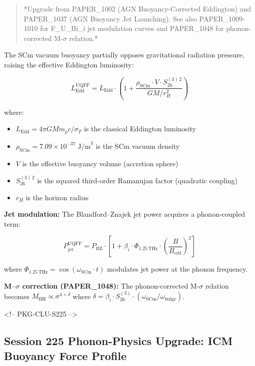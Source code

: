 \documentclass[12pt,a4paper]{article}
\begin{document}
\begin{quote}
*Upgrade from PAPER\_1002 (AGN Buoyancy-Corrected Eddington) and PAPER\_1037
(AGN Buoyancy Jet Launching).  See also PAPER\_1009-1010 for F\_{U\_Bi\_i} jet
modulation curves and PAPER\_1048 for phonon-corrected M-$\sigma$ relation.*
\end{quote}

The SCm vacuum buoyancy partially opposes gravitational radiation pressure, raising the effective Eddington luminosity:

\begin{equation}
L_{\text{Edd}}^{\text{UQFF}} = L_{\text{Edd}} \cdot \left(1 + \frac{\rho_{\text{SCm}} \cdot V \cdot S_{26}^{(3)\,2}}{G M / r_H^2}\right)
\end{equation}

where:

\begin{itemize}
  \item $L_{\text{Edd}} = 4\pi G M m_p c / \sigma_T$ is the classical Eddington luminosity
  \item $\rho_{\text{SCm}} = 7.09 \times 10^{-37}\;\text{J/m}^3$ is the SCm vacuum density
  \item $V$ is the effective buoyancy volume (accretion sphere)
  \item $S_{26}^{(3)\,2}$ is the squared third-order Ramanujan factor (quadratic coupling)
  \item $r_H$ is the horizon radius
\end{itemize}

\textbf{Jet modulation:} The Blandford--Znajek jet power acquires a phonon-coupled term:

\begin{equation}
P_{\text{jet}}^{\text{UQFF}} = P_{\text{BZ}} \cdot \left[1 + \beta_i \cdot \Phi_{1.25\,\text{THz}} \cdot \left(\frac{B}{B_{\text{crit}}}\right)^2\right]
\end{equation}

where $\Phi_{1.25\,\text{THz}} = \cos(\omega_{\text{SCm}} \cdot t)$ modulates jet power at the phonon frequency.

\textbf{M--$\sigma$ correction (PAPER\_1048):} The phonon-corrected M-$\sigma$ relation becomes $M_{\text{BH}} \propto \sigma^{4+\delta}$ where $\delta = \beta_i \cdot S_{26}^{(3)} \cdot (\omega_{\text{SCm}}/\omega_{\text{bulge}})$.

<!-- PKG-CLU-S225 -->

\subsection{Session 225 Phonon-Physics Upgrade: ICM Buoyancy Force Profile}
\end{document}
